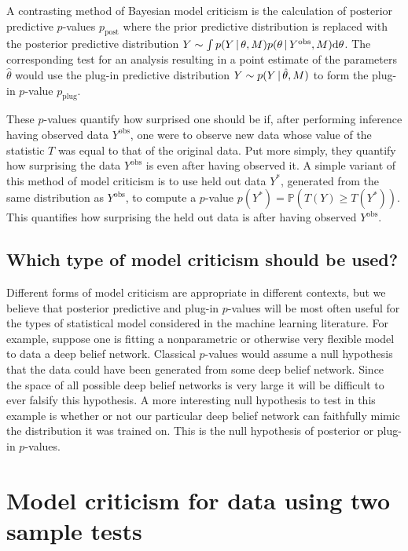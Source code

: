 A contrasting method of Bayesian model criticism is the calculation of posterior predictive $p$-values \citep[e.g.][]{Guttman1967-my, Rubin1984-tw} $p_\textrm{post}$ where the prior predictive distribution is replaced with the posterior predictive distribution ${Y \sim \int p(Y \,|\, \theta, M)p(\theta \,|\, Y^\textrm{obs}, M) \mathrm{d}\theta}$.
The corresponding test for an analysis resulting in a point estimate of the parameters $\hat\theta$ would use the plug-in predictive distribution ${Y \sim p(Y \,|\, \hat\theta, M)}$ to form the plug-in $p$-value $p_\textrm{plug}$.

These $p$-values quantify how surprised one should be if, after performing inference having observed data $Y^\textrm{obs}$, one were to observe new data whose value of the statistic $T$ was equal to that of the original data.
Put more simply, they quantify how surprising the data $Y^\textrm{obs}$ is even after having observed it.
A simple variant of this method of model criticism is to use held out data $Y^*$, generated from the same distribution as $Y^\textrm{obs}$, to compute a $p$-value \ie ${p(Y^*) = \mathbb{P}(T(Y)\geq T(Y^*))}$.
This quantifies how surprising the held out data is after having observed $Y^\textrm{obs}$.

\subsection{Which type of model criticism should be used?}

Different forms of model criticism are appropriate in different contexts, but we believe that posterior predictive and plug-in $p$-values will be most often useful for the types of statistical model considered in the machine learning literature.
For example, suppose one is fitting a nonparametric or otherwise very flexible model to data \eg a deep belief network.
Classical $p$-values would assume a null hypothesis that the data could have been generated from some deep belief network.
Since the space of all possible deep belief networks is very large it will be difficult to ever falsify this hypothesis.
A more interesting null hypothesis to test in this example is whether or not our particular deep belief network can faithfully mimic the distribution it was trained on.
This is the null hypothesis of posterior or plug-in $p$-values.

\section{Model criticism for \iid data using two sample tests}
\label{sec:model-crit-two-sample}

